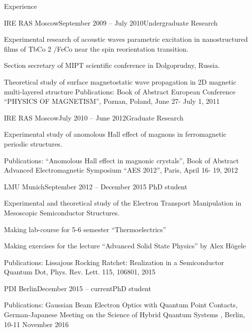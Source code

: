 \documentclass{article} %
\begin{document}
\begin{section}{Experience}

\begin{subsection}{IRE RAS Moscow}{September 2009 – July 2010}{Undergraduate Research}{}
\item Experimental research of acoustic waves parametric excitation in nanostructured films of
TbCo 2 /FeCo near the spin reorientation transition.
\item Section secretary of MIPT scientific conference in Dolgoprudny, Russia.
\item Theoretical study of surface magnetostatic wave propagation in 2D magnetic multi-layered structure
Publications: Book of Abstract European Conference “PHYSICS OF MAGNETISM”, Poznan, Poland, June 27- July 1, 2011
\end{subsection}

\begin{subsection}{IRE RAS Moscow}{July 2010 – June 2012}{Graduate Research}{}
\item Experimental study of anomolous Hall effect of magnons in ferromagnetic periodic
structures.

Publications: “Anomolous Hall effect in magnonic crystals”, Book of Abstract Advanced Electromagnetic
Symposium “AES 2012”, Paris, April 16- 19, 2012
\end{subsection}

\begin{subsection}{LMU Munich}{September 2012 – December 2015}{ PhD student}{}
\item Experimental and theoretical study of the Electron Transport Manipulation in Mesoscopic
Semiconductor Structures.
\item Making lab-course for 5-6 semester “Thermoelectrics”
\item Making exercises for the lecture “Advanced Solid State Physics” by Alex H\"ogele

Publications: Lissajous Rocking Ratchet: Realization in a Semiconductor Quantum Dot, Phys. Rev. Lett. 115,
106801, 2015
\end{subsection}

\begin{subsection}{PDI Berlin}{December 2015 – current}{PhD student}{}
\item Publications: Gaussian Beam Electron Optics with Quantum Point Contacts, German-Japanese Meeting on the
Science of Hybrid Quantum Systems , Berlin, 10-11 November 2016

\end{subsection}

\end{section}
\end{document}
